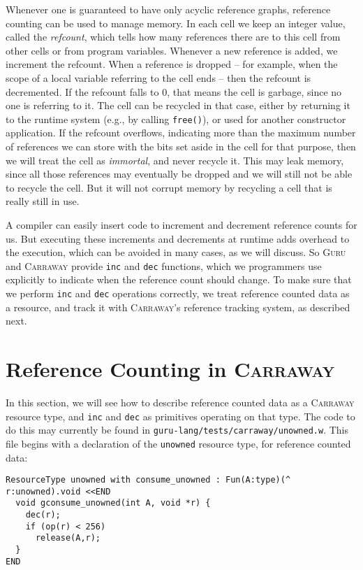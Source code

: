 \documentclass{book}[12pt]
\newcommand{\guru}[0]{\textsc{Guru}\xspace}
\newcommand{\carraway}[0]{\textsc{Carraway}\xspace}
\begin{document}
Whenever one is guaranteed to have only acyclic reference graphs,
reference counting can be used to manage memory.  In each cell we keep
an integer value, called the \emph{refcount}, which tells how many
references there are to this cell from other cells or from program
variables.  Whenever a new reference is added, we increment the
refcount.  When a reference is dropped -- for example, when the scope
of a local variable referring to the cell ends -- then the refcount is
decremented.  If the refcount falls to $0$, that means the cell is
garbage, since no one is referring to it.  The cell can be recycled in
that case, either by returning it to the runtime system (e.g., by
calling \texttt{free()}), or used for another constructor application.
If the refcount overflows, indicating more than the maximum number of
references we can store with the bits set aside in the cell for that
purpose, then we will treat the cell as \emph{immortal}, and never
recycle it.  This may leak memory, since all those references may
eventually be dropped and we will still not be able to recycle the
cell.  But it will not corrupt memory by recycling a cell that is
really still in use.

A compiler can easily insert code to increment and decrement reference
counts for us.  But executing these increments and decrements at
runtime adds overhead to the execution, which can be avoided in many
cases, as we will discuss.  So \guru and \carraway provide
\texttt{inc} and \texttt{dec} functions, which we programmers use
explicitly to indicate when the reference count should change.  To
make sure that we perform \texttt{inc} and \texttt{dec} operations
correctly, we treat reference counted data as a resource, and track it
with \carraway's reference tracking system, as described next.

\section{Reference Counting in \carraway}
\label{ch9:rc}

In this section, we will see how to describe reference counted data as
a \carraway resource type, and \texttt{inc} and \texttt{dec} as
primitives operating on that type.  The code to do this may currently
be found in \texttt{guru-lang/tests/carraway/unowned.w}.  This file
begins with a declaration of the \texttt{unowned} resource type, for
reference counted data:

\begin{verbatim}
ResourceType unowned with consume_unowned : Fun(A:type)(^ r:unowned).void <<END
  void gconsume_unowned(int A, void *r) {
    dec(r);
    if (op(r) < 256)
      release(A,r);
  }
END
\end{verbatim}
\end{document}
